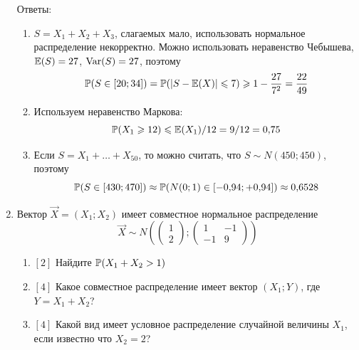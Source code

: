 \documentclass[12pt, a4paper]{article}\usepackage[]{graphicx}\usepackage[]{color}
\begin{document}
\begin{enumerate}
			Ответы:
			\begin{enumerate}
				\item $S=X_1+X_2+X_3$, слагаемых мало, использовать нормальное распределение некорректно. Можно использовать неравенство Чебышева, $\E(S)=27$, $\Var(S)=27$, поэтому
				\begin{equation}
				\P(S\in [20;34])=\P( |S-\E(X)| \leq 7) \geq 1-\frac{27}{7^2}=\frac{22}{49}
				\end{equation}
				\item Используем неравенство Маркова:
				\begin{equation}
				\P(X_1 \geq 12)\leq \E(X_1)/12=9/12=0{,}75
				\end{equation}
				\item Если $S=X_1+\ldots+X_{50}$, то можно считать, что $S\sim N(450;450)$, поэтому
				\begin{equation}
				\P(S \in [430;470])\approx \P( N(0;1) \in [-0{,}94;+0{,}94])\approx 0{,}6528
				\end{equation}

			\end{enumerate}


			\item Вектор $\vec{X}=(X_1;X_2)$ имеет совместное нормальное распределение
			\begin{equation}
			\vec{X}\sim N\left(
			\left(\begin{array}{l}
			{1} \\
			{2}
			\end{array}\right);
			\left(\begin{array}{cc}
			{1} & {-1} \\
			{-1} & {9}
			\end{array}\right)
			\right)
			\end{equation}
			\begin{enumerate}
				\item $[2]$ Найдите $\P(X_1+X_2>1)$
				\item $[4]$ Какое совместное распределение имеет вектор $(X_1;Y)$, где $Y=X_1+X_2$?
				\item $[4]$ Какой вид имеет условное распределение случайной величины $X_1$, если известно что $X_2=2$?
			\end{enumerate}



\end{enumerate}
\end{document}
